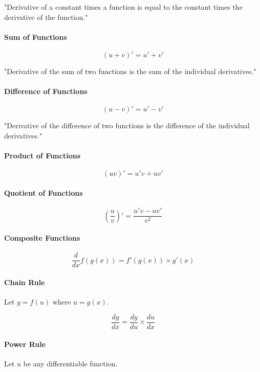 \documentclass[../main.tex]{subfiles}
\begin{document}
"Derivative of a constant times a function is equal to the constant times the derivative of the function."

\paragraph{Sum of Functions}

$$
  (u + v)' = u' + v'
$$

"Derivative of the sum of two functions is the sum of the individual derivatives."

\paragraph{Difference of Functions}

$$
  (u - v)' = u' - v'
$$

"Derivative of the difference of two functions is the difference of the individual derivatives."

\paragraph{Product of Functions}

$$
  (uv)' = u'v + uv'
$$

\paragraph{Quotient of Functions}

$$
  (\frac{u}{v})' = \frac{u'v - uv'}{v^2}
$$

\paragraph{Composite Functions}

$$
  \frac{d}{dx}f(g(x))=f'(g(x))\times g'(x)
$$

\paragraph{Chain Rule}

Let $y=f(u)$ where $u=g(x)$.

$$
  \frac{dy}{dx}=\frac{dy}{du}\times \frac{du}{dx}
$$

\paragraph{Power Rule}

Let $u$ be any differentiable function.
\end{document}
